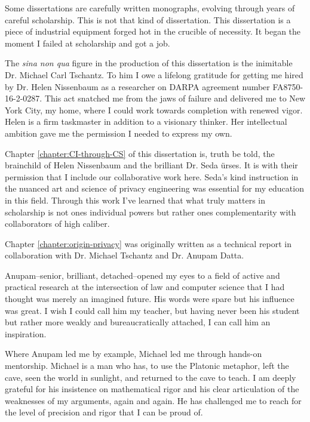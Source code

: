 \documentclass[../thesis.tex]{subfiles}
\begin{document}
 Some dissertations are carefully written monographs, evolving through years of careful scholarship.
 This is not that kind of dissertation.
 This dissertation is a piece of industrial equipment forged hot in the crucible of necessity.
 It began the moment I failed at scholarship and got a job.

 The \textit{sina non qua} figure in the production of this dissertation is the inimitable Dr. Michael Carl Tschantz.
 To him I owe a lifelong gratitude for getting me hired by Dr. Helen Nissenbaum as a researcher on DARPA agreement number FA8750-16-2-0287.
 This act snatched me from the jaws of failure and delivered me to New York City, my home, where I could work towards completion with renewed vigor.
 Helen is a firm taskmaster in addition to a visionary thinker.
 Her intellectual ambition gave me the permission I needed to express my own.

 Chapter \ref{chapter:CI-through-CS} of this dissertation is, truth be told, the brainchild of Helen Nissenbaum and the brilliant Dr. Seda {\"u}rses.
 It is with their permission that I include our collaborative work here.
 Seda's kind instruction in the nuanced art and science of privacy engineering was essential for my education in this field.
 Through this work I've learned that what truly matters in scholarship is not ones individual powers but rather ones complementarity with collaborators of high caliber.

 Chapter \ref{chapter:origin-privacy} was originally written as a technical report in collaboration with Dr. Michael Tschantz and Dr. Anupam Datta.

 Anupam--senior, brilliant, detached--opened my eyes to a field of active and practical research at the intersection of law and computer science that I had thought was merely an imagined future. His words were spare but his influence was great.
 I wish I could call him my teacher, but having never been his student but rather more weakly and bureaucratically attached, I can call him an inspiration.

 Where Anupam led me by example, Michael led me through hands-on mentorship.
 Michael is a man who has, to use the Platonic metaphor, left the cave, seen the world in sunlight, and returned to the cave to teach. 
 I am deeply grateful for his insistence on mathematical rigor and his clear articulation of the weaknesses of my arguments, again and again.
 He has challenged me to reach for the level of precision and rigor that I can be proud of.
\end{document}
